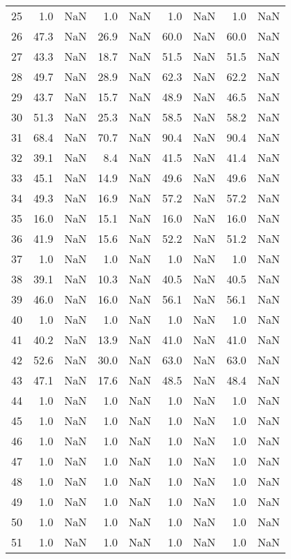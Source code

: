 \begin{tabular}{lrrrrrrrr}
25 & 1.0 & NaN & 1.0 & NaN & 1.0 & NaN & 1.0 & NaN \\
26 & 47.3 & NaN & 26.9 & NaN & 60.0 & NaN & 60.0 & NaN \\
27 & 43.3 & NaN & 18.7 & NaN & 51.5 & NaN & 51.5 & NaN \\
28 & 49.7 & NaN & 28.9 & NaN & 62.3 & NaN & 62.2 & NaN \\
29 & 43.7 & NaN & 15.7 & NaN & 48.9 & NaN & 46.5 & NaN \\
30 & 51.3 & NaN & 25.3 & NaN & 58.5 & NaN & 58.2 & NaN \\
31 & 68.4 & NaN & 70.7 & NaN & 90.4 & NaN & 90.4 & NaN \\
32 & 39.1 & NaN & 8.4 & NaN & 41.5 & NaN & 41.4 & NaN \\
33 & 45.1 & NaN & 14.9 & NaN & 49.6 & NaN & 49.6 & NaN \\
34 & 49.3 & NaN & 16.9 & NaN & 57.2 & NaN & 57.2 & NaN \\
35 & 16.0 & NaN & 15.1 & NaN & 16.0 & NaN & 16.0 & NaN \\
36 & 41.9 & NaN & 15.6 & NaN & 52.2 & NaN & 51.2 & NaN \\
37 & 1.0 & NaN & 1.0 & NaN & 1.0 & NaN & 1.0 & NaN \\
38 & 39.1 & NaN & 10.3 & NaN & 40.5 & NaN & 40.5 & NaN \\
39 & 46.0 & NaN & 16.0 & NaN & 56.1 & NaN & 56.1 & NaN \\
40 & 1.0 & NaN & 1.0 & NaN & 1.0 & NaN & 1.0 & NaN \\
41 & 40.2 & NaN & 13.9 & NaN & 41.0 & NaN & 41.0 & NaN \\
42 & 52.6 & NaN & 30.0 & NaN & 63.0 & NaN & 63.0 & NaN \\
43 & 47.1 & NaN & 17.6 & NaN & 48.5 & NaN & 48.4 & NaN \\
44 & 1.0 & NaN & 1.0 & NaN & 1.0 & NaN & 1.0 & NaN \\
45 & 1.0 & NaN & 1.0 & NaN & 1.0 & NaN & 1.0 & NaN \\
46 & 1.0 & NaN & 1.0 & NaN & 1.0 & NaN & 1.0 & NaN \\
47 & 1.0 & NaN & 1.0 & NaN & 1.0 & NaN & 1.0 & NaN \\
48 & 1.0 & NaN & 1.0 & NaN & 1.0 & NaN & 1.0 & NaN \\
49 & 1.0 & NaN & 1.0 & NaN & 1.0 & NaN & 1.0 & NaN \\
50 & 1.0 & NaN & 1.0 & NaN & 1.0 & NaN & 1.0 & NaN \\
51 & 1.0 & NaN & 1.0 & NaN & 1.0 & NaN & 1.0 & NaN \\

\end{tabular}
